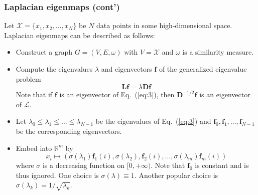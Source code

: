 \documentclass[professionalfonts,hyperref={colorlinks=true,linkcolor=red}]{beamer}
\begin{document}
\begin{frame}
  \frametitle{Laplacian eigenmaps (cont')}
  Let $\mathcal{X} = \{x_1,x_2,\dots,x_N\}$ be $N$ data points in some
  high-dimensional space. Laplacian eigenmaps can be described as
  follows:
  \begin{itemize}
  \item<2-> Construct a graph $G = (V,E,\omega)$ with $V = \mathcal{X}$
    and $\omega$ is a similarity measure.
  \item<3-> Compute the eigenvalues $\lambda$ and eigenvectors
    $\bm{f}$ of the generalized eigenvalue problem
    \begin{equation}
      \label{eq:3}
      \bm{Lf} = \lambda \bm{Df}
    \end{equation}
    Note that if $\bm{f}$ is an eigenvector of Eq.~(\ref{eq:3}), then
    $\bm{D}^{-1/2}\bm{f}$ is an eigenvector of $\mathcal{L}$.
  \item<4-> Let $\lambda_0 \leq \lambda_1 \leq \dots \leq \lambda_{N-1}$ be
    the eigenvalues of Eq.~(\ref{eq:3}) and $\bm{f}_0, \bm{f}_1,
    \dots, \bm{f}_{N-1}$ be the corresponding eigenvectors. 
  \item<5-> Embed into $\mathbb{R}^{m}$ by
    \begin{equation}
      \label{eq:4}
      x_i \mapsto (\sigma(\lambda_1) \bm{f}_{1}(i), \sigma(\lambda_2),
      \bm{f}_{2}(i), \dots, \sigma(\lambda_m) \bm{f}_{m}(i))
    \end{equation}
    where $\sigma$ is a decreasing function on $[0,+\infty)$.  Note
    that $\bm{f}_0$ is constant and is thus ignored. One choice is
    $\sigma(\lambda) \equiv 1$. Another popular choice is
    $\sigma(\lambda_k) = 1/\sqrt{\lambda_k}$.
  \end{itemize}
\end{frame}

\end{document}
